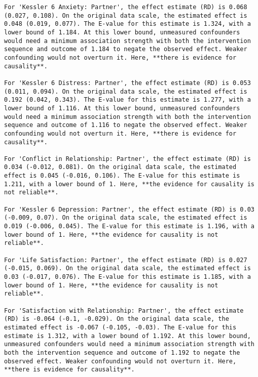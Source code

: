 \documentclass[
  singlecolumn]{article}
\begin{document}
\begin{verbatim}
For 'Kessler 6 Anxiety: Partner', the effect estimate (RD) is 0.068 (0.027, 0.108). On the original data scale, the estimated effect is 0.048 (0.019, 0.077). The E-value for this estimate is 1.324, with a lower bound of 1.184. At this lower bound, unmeasured confounders would need a minimum association strength with both the intervention sequence and outcome of 1.184 to negate the observed effect. Weaker confounding would not overturn it. Here, **there is evidence for causality**.

For 'Kessler 6 Distress: Partner', the effect estimate (RD) is 0.053 (0.011, 0.094). On the original data scale, the estimated effect is 0.192 (0.042, 0.343). The E-value for this estimate is 1.277, with a lower bound of 1.116. At this lower bound, unmeasured confounders would need a minimum association strength with both the intervention sequence and outcome of 1.116 to negate the observed effect. Weaker confounding would not overturn it. Here, **there is evidence for causality**.

For 'Conflict in Relationship: Partner', the effect estimate (RD) is 0.034 (-0.012, 0.081). On the original data scale, the estimated effect is 0.045 (-0.016, 0.106). The E-value for this estimate is 1.211, with a lower bound of 1. Here, **the evidence for causality is not reliable**.

For 'Kessler 6 Depression: Partner', the effect estimate (RD) is 0.03 (-0.009, 0.07). On the original data scale, the estimated effect is 0.019 (-0.006, 0.045). The E-value for this estimate is 1.196, with a lower bound of 1. Here, **the evidence for causality is not reliable**.

For 'Life Satisfaction: Partner', the effect estimate (RD) is 0.027 (-0.015, 0.069). On the original data scale, the estimated effect is 0.03 (-0.017, 0.076). The E-value for this estimate is 1.185, with a lower bound of 1. Here, **the evidence for causality is not reliable**.

For 'Satisfaction with Relationship: Partner', the effect estimate (RD) is -0.064 (-0.1, -0.029). On the original data scale, the estimated effect is -0.067 (-0.105, -0.03). The E-value for this estimate is 1.312, with a lower bound of 1.192. At this lower bound, unmeasured confounders would need a minimum association strength with both the intervention sequence and outcome of 1.192 to negate the observed effect. Weaker confounding would not overturn it. Here, **there is evidence for causality**.


\end{verbatim}
\end{document}
